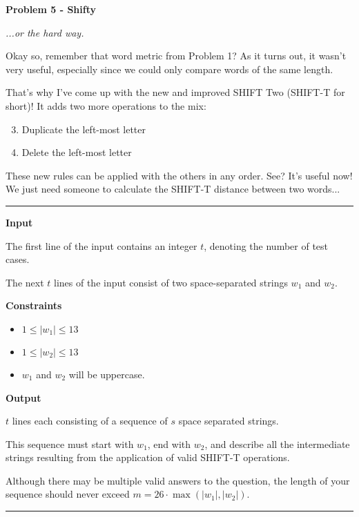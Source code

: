 \LARGE \textbf{Problem 5 - Shifty} \normalsize

{\itshape ...or the hard way.}

Okay so, remember that word metric from Problem 1? 
As it turns out, it wasn't very useful, especially since we could only compare words of the same length.

That's why I've come up with the new and improved SHIFT Two (SHIFT-T for short)! It adds two more operations to the mix:

\begin{enumerate}
    \setcounter{enumi}{2}
    \item Duplicate the left-most letter
    \item Delete the left-most letter
\end{enumerate}

These new rules can be applied with the others in any order. See? It's useful now!
We just need someone to calculate the SHIFT-T distance between two words...

\vspace{8pt}
\hrule

\textbf{Input}

The first line of the input contains an integer $t$, denoting the number of test cases.

The next $t$ lines of the input consist of two space-separated strings $w_1$ and $w_2$.

\textbf{Constraints}

\begin{itemize}
    \item $1 \leq |w_1| \leq 13$
    \item $1 \leq |w_2| \leq 13$
    \item $w_1$ and $w_2$ will be uppercase.
\end{itemize}

\textbf{Output}

$t$ lines each consisting of a sequence of $s$ space separated strings. 

This sequence must start with $w_1$, end with $w_2$, 
and describe all the intermediate strings resulting from the application of valid SHIFT-T operations. 

Although there may be multiple valid answers to the question, 
the length of your sequence should never exceed $m = 26 \cdot \max{(|w_1|, |w_2|)}$.

\vspace{8pt}
\hrule

